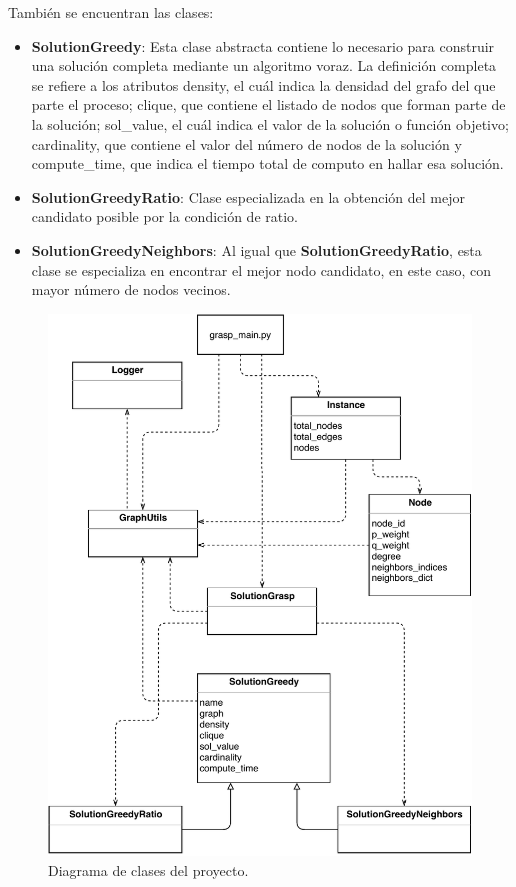 También se encuentran las clases:
 \begin{itemize}
	\item \textbf{SolutionGreedy}: Esta clase abstracta contiene lo necesario para construir una solución completa mediante un algoritmo voraz. La definición completa se refiere a los atributos density, el cuál indica la densidad del grafo del que parte el proceso; clique, que contiene el listado de nodos que forman parte de la solución; sol\_value, el cuál indica el valor de la solución o función objetivo; cardinality, que contiene el valor del número de nodos de la solución y compute\_time, que indica el tiempo total de computo en hallar esa solución.
	\item \textbf{SolutionGreedyRatio}: Clase especializada en la obtención del mejor candidato posible por la condición de ratio.
	\item \textbf{SolutionGreedyNeighbors}: Al igual que \textbf{SolutionGreedyRatio}, esta clase se especializa en encontrar el mejor nodo candidato, en este caso, con mayor número de nodos vecinos.
\end{itemize}


\begin{figure}[H]
	\centering
	\includegraphics{Figures/Diagrama-clases.pdf}
	\caption{Diagrama de clases del proyecto.}
	\label{fig:diagrama-clases}
\end{figure}

